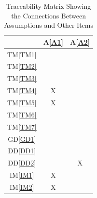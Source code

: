 \documentclass[12pt]{article}
\newcommand{\dref}[1]{GD\ref{#1}}
\newcommand{\ddref}[1]{DD\ref{#1}}
\newcommand{\tref}[1]{TM\ref{#1}}
\newcommand{\aref}[1]{A\ref{#1}}
\newcommand{\iref}[1]{IM\ref{#1}}
\begin{document}
\begin{table}[h!]
\centering
\begin{tabular}{|c|c|c|}
\hline
            & \aref{A1} & \aref{A2} \\
\hline
\tref{TM1}  &           &           \\ \hline
\tref{TM2}  &           &           \\ \hline
\tref{TM3}  &           &           \\ \hline
\tref{TM4}  &     X     &           \\ \hline
\tref{TM5}  &     X     &           \\ \hline
\tref{TM6}  &           &           \\ \hline
\tref{TM7}  &           &           \\ \hline
\dref{GD1}  &           &           \\ \hline
\ddref{DD1} &           &           \\ \hline
\ddref{DD2} &           &     X     \\ \hline
\iref{IM1}  &     X     &           \\ \hline
\iref{IM2}  &     X     &           \\ \hline
\end{tabular}
\caption{Traceability Matrix Showing the Connections Between Assumptions and Other Items}
\label{Table:A_trace}
\end{table}

\newpage
\end{document}
